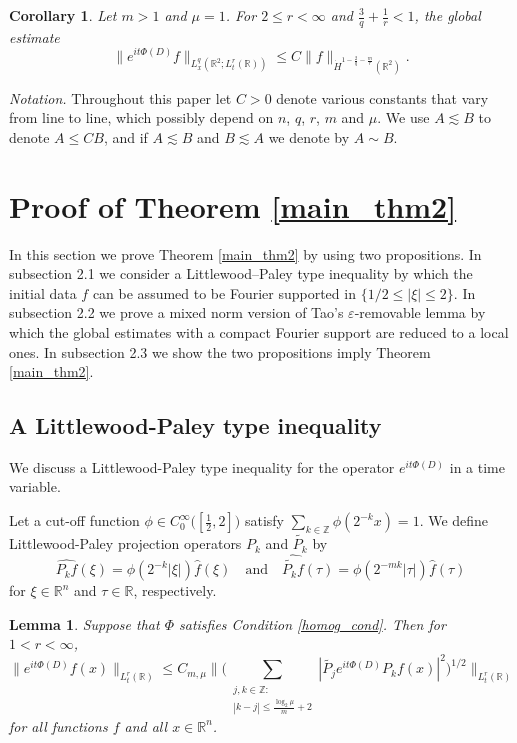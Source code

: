\documentclass[11pt,reqno]{amsart}
\theoremstyle{plain}
\newtheorem{lem}[thm]{Lemma}
\newtheorem{cor}[thm]{Corollary}
\theoremstyle{definition}
\theoremstyle{remark}
\numberwithin{equation}{section}
\begin{document}
\begin{cor} \label{main_thm}
Let $m>1$ and $\mu=1$. For $2 \leq r < \infty$ and $\frac{3}{q} + \frac{1}{r} < 1$, the global estimate
    \begin{equation*} 
    \|e^{it\Phi(D)} f \|_{L_x^q(\mathbb R^2;L_t^r(\mathbb R))}
    \le C \|f\|_{\dot H^{1 - \frac{2}{q} -\frac{m}{r}}(\mathbb R^2)}.
    \end{equation*}
\end{cor}


\textit{Notation.} Throughout this paper let $C>0$ denote various constants that vary from line to line, which possibly depend on $n$, $q$, $r$, $m$ and $\mu$. We use $A \lesssim B$ to denote $A \le CB$, and if $A \lesssim B$ and $B \lesssim A$ we denote by $A \sim B$.


\section{Proof of Theorem \ref{main_thm2}}
In this section we prove Theorem \ref{main_thm2} by using two propositions. In subsection 2.1 we consider a Littlewood--Paley type inequality by which the initial data $f$ can be assumed to be Fourier supported in $\{1/2 \le |\xi| \le 2\}$. In subsection 2.2 we prove a mixed norm version of Tao's $\varepsilon$-removable lemma by which the global estimates with a compact Fourier support are reduced to a local ones. In subsection 2.3 we show the two propositions imply Theorem \ref{main_thm2}.


\subsection{A Littlewood-Paley type inequality}
We discuss a Littlewood-Paley type inequality  for the operator $e^{it\Phi(D)}$ in a time variable.


Let a cut-off function $\phi \in C_0^{\infty} \big( [\frac{1}{2}, 2] \big)$ satisfy
$ \sum_{k\in\mathbb{Z}} \phi( {2^{-k}} x) =1 $.
We define Littlewood-Paley projection operators $P_{k}$ and $\widetilde{P_k}$ by
    \[
    \widehat{P_k f}(\xi) = \phi(2^{-k}|\xi|) \hat{f}(\xi)
    \quad\mbox{and}\quad
    \widehat{\widetilde{P_k} f}(\tau) = \phi (2^{-mk}|\tau| ) \hat{f}(\tau)
    \] for $\xi \in \mathbb R^n$ and $\tau \in \mathbb R$, respectively.


\begin{lem}\label{LP_lemma}
Suppose that $\Phi$ satisfies Condition \ref{homog_cond}. Then for $1<r<\infty$,
    \begin{equation*}%
    \big\|e^{it\Phi(D)} f(x) \big\|_{L_t^r(\mathbb R)}
    \leq C_{m,\mu} \Big\| \Big(\sum_{\substack{j,k \in \mathbb Z: \\|k-j| \leq \frac{\log_2 \mu}{m}+2}} | \widetilde{P_j} e^{it\Phi(D)}P_kf(x) |^2\Big)^{1/2} \Big\|_{L_t^r(\mathbb R)}
    \end{equation*}
for all functions $f$ and all $x \in \mathbb R^n$.
\end{lem}
\end{document}
